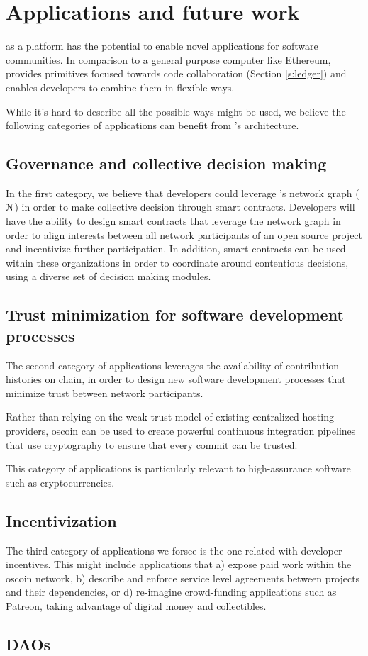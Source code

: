 
\section{Applications and future work}

\oscoin{} as a platform has the potential to enable novel applications for
software communities. In comparison to a general purpose computer like
Ethereum, \oscoin{} provides primitives focused towards code collaboration
(Section \ref{s:ledger}) and enables developers to combine them in flexible ways.

While it’s hard to describe all the possible ways \oscoin{} might be used, we
believe the following categories of applications can benefit from \oscoin{}’s
architecture.

\subsection{Governance and collective decision making}

In the first category, we believe that developers could leverage \oscoin{}’s
network graph ($\mathcal{N}$) in order to make collective decision through smart
contracts.  Developers will have the ability to design smart contracts that
leverage the network graph in order to align interests between all network
participants of an open source project and incentivize further participation.
In addition, smart contracts can be used within these organizations in order to
coordinate around contentious decisions, using a diverse set of decision making
modules.

\subsection{Trust minimization for software development processes}
The second category of applications leverages the availability of contribution
histories on chain, in order to design new software development processes that
minimize trust between network participants.

Rather than relying on the weak trust model of existing centralized hosting
providers, oscoin can be used to create powerful continuous integration
pipelines that use cryptography to ensure that every commit can be trusted.

This category of applications is particularly relevant to high-assurance
software such as cryptocurrencies.

\subsection{Incentivization}
The third category of applications we forsee is the one related with
developer incentives. This might include applications that a) expose paid work
within the oscoin network, b) describe and enforce service level agreements
between projects and their dependencies, or d) re-imagine crowd-funding
applications such as Patreon, taking advantage of digital money and collectibles.

\subsection{DAOs}

